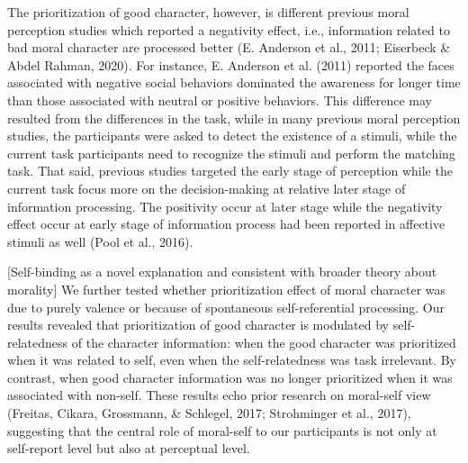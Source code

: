 \documentclass[
  man]{apa6}
\begin{document}
The prioritization of good character, however, is different previous moral perception studies which reported a negativity effect, i.e., information related to bad moral character are processed better (E. Anderson et al., 2011; Eiserbeck \& Abdel Rahman, 2020). For instance, E. Anderson et al. (2011) reported the faces associated with negative social behaviors dominated the awareness for longer time than those associated with neutral or positive behaviors. This difference may resulted from the differences in the task, while in many previous moral perception studies, the participants were asked to detect the existence of a stimuli, while the current task participants need to recognize the stimuli and perform the matching task. That said, previous studies targeted the early stage of perception while the current task focus more on the decision-making at relative later stage of information processing. The positivity occur at later stage while the negativity effect occur at early stage of information process had been reported in affective stimuli as well (Pool et al., 2016).

{[}Self-binding as a novel explanation and consistent with broader theory about morality{]} We further tested whether prioritization effect of moral character was due to purely valence or because of spontaneous self-referential processing. Our results revealed that prioritization of good character is modulated by self-relatedness of the character information: when the good character was prioritized when it was related to self, even when the self-relatedness was task irrelevant. By contrast, when good character information was no longer prioritized when it was associated with non-self. These results echo prior research on moral-self view (Freitas, Cikara, Grossmann, \& Schlegel, 2017; Strohminger et al., 2017), suggesting that the central role of moral-self to our participants is not only at self-report level but also at perceptual level.
\end{document}

